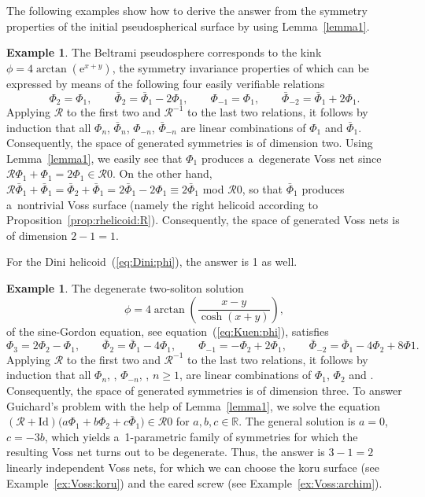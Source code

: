 \documentclass[pdftex]{sigma}
\def\eqref#1{{\rm(\ref{#1})}}
\def\RR{{\mathbb R}}
\def\RO{{\mathcal R}}
\numberwithin{equation}{section}
\theoremstyle{definition}
\newtheorem{Example}[Theorem]{Example}
\begin{document}
The following examples show how to derive the answer from the
symmetry properties of the initial pseudospherical surface by using
Lemma~\ref{lemma1}.




\begin{Example}
The Beltrami pseudosphere corresponds to the kink
$\phi = 4 \arctan(\mathrm{e}^{x + y})$, the symmetry invariance properties
of which can be expressed by means of the following four easily verifiable
relations
\[
\Phi_2 = \Phi_1, \qquad
\bar\Phi_2 = \bar\Phi_1 - 2 \Phi_1,
\qquad
\Phi_{-1} = \Phi_1, \qquad
\bar\Phi_{-2} = \bar\Phi_1 + 2 \Phi_1.
\]
Applying $\RO$ to the first two and $\RO^{-1}$ to the last two relations,
it follows by induction that all
$\Phi_n$, $\bar\Phi_n$, $\Phi_{-n}$, $\bar\Phi_{-n}$
are linear combinations of $\Phi_1$ and $\bar\Phi_1$.
Consequently, the space of generated symmetries is of dimension two.
Using Lemma~\ref{lemma1}, we easily see that $\Phi_1$ produces a~degenerate Voss net since $\RO \Phi_1 + \Phi_1 = 2 \Phi_1 \in \RO0$.
On the other hand,
$\RO\bar\Phi_1 + \bar\Phi_1 = \bar\Phi_2 + \bar\Phi_1
 = 2\bar\Phi_1 - 2 \Phi_1 \equiv 2\bar\Phi_1$ mod $\RO0$,
so that $\bar\Phi_1$ produces a~nontrivial Voss surface
(namely the right helicoid according to
Proposition~\ref{prop:rhelicoid:R}).
Consequently, the space of generated Voss nets is of dimension
$2 - 1 = 1$.

For the Dini helicoid~\eqref{eq:Dini:phi}, the answer is 1 as well.
\end{Example}


\begin{Example}
The degenerate two-soliton solution
\[
\phi = 4 \arctan\left(\frac{x - y}{\cosh(x + y)}\right),
\]
of the sine-Gordon equation, see equation~\eqref{eq:Kuen:phi},
satisfies
\[
\Phi_3 = 2 \Phi_2 - \Phi_1, \qquad
\bar\Phi_2 = \bar\Phi_1 - 4 \Phi_1,
\qquad
\Phi_{-1} = -\Phi_2 + 2 \Phi_1, \qquad
\bar\Phi_{-2} = \bar\Phi_1 - 4 \Phi_2 + 8 \Phi1.
\]
Applying $\RO$ to the first two and $\RO^{-1}$ to the last two relations,
it follows by induction that all
$\Phi_n$, , $\Phi_{-n}$,
, $n \ge 1$,
are linear combinations of $\Phi_1$, $\Phi_2$ and .
Consequently, the space of generated symmetries is of dimension three.
To answer Guichard's problem with the help of Lemma~\ref{lemma1},
we solve the equation
$(\RO + \mathrm{Id})\bigl(a \Phi_1 + b\Phi_2 + c\bar\Phi_1\bigr) \in \RO0$
for $a,b,c \in \RR$.
The general solution is $a = 0$, $c = -3 b$, which yields a~1-parametric family of symmetries for which the resulting Voss
net turns out to be degenerate.
Thus, the answer is $3 - 1 = 2$ linearly independent Voss nets,
for which we can choose the koru surface
(see Example~\ref{ex:Voss:koru})
and the eared screw (see Example~\ref{ex:Voss:archim}).
\end{Example}
\end{document}
